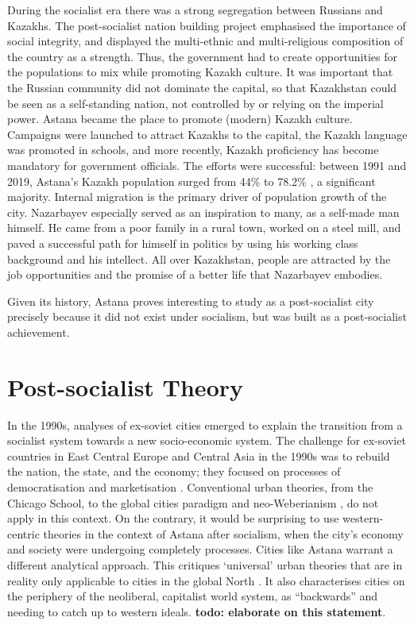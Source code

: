 \documentclass{article}
\begin{document}
During the socialist era there was a strong segregation between Russians and Kazakhs. The post-socialist nation building project emphasised the importance of social integrity, and displayed the multi-ethnic and multi-religious composition of the country as a strength. Thus, the government had to create opportunities for the populations to mix while promoting Kazakh culture. It was important that the Russian community did not dominate the capital, so that Kazakhstan could be seen as a self-standing nation, not controlled by or relying on the imperial power. 
Astana became the place to promote (modern) Kazakh culture. Campaigns were launched to attract Kazakhs to the capital, the Kazakh language was promoted in schools, and more recently, Kazakh proficiency has become mandatory for government officials. The efforts were successful: between 1991 and 2019, Astana's Kazakh population surged from 44\% to 78.2\% \parencite{unfpa2020wekazakhstan}, a significant majority. 
Internal migration is the primary driver of population growth of the city. Nazarbayev especially served as an inspiration to many, as a self-made man himself. He came from a poor family in a rural town, worked on a steel mill, and paved a successful path for himself in politics by using his working class background and his intellect. All over Kazakhstan, people are attracted by the job opportunities and the promise of a better life that Nazarbayev embodies.

Given its history, Astana proves interesting to study as a post-socialist city precisely because it did not exist under socialism, but was built as a post-socialist achievement.

\section{Post-socialist Theory}

In the 1990s, analyses of ex-soviet cities emerged to explain the transition from a socialist system towards a new socio-economic system. The challenge for ex-soviet countries in East Central Europe and Central Asia in the 1990s was to rebuild the nation, the state, and the economy; they focused on processes of democratisation and marketisation \parencite{ferenvcuhova2016introduction}. Conventional urban theories, from the Chicago School, to the global cities paradigm and neo-Weberianism \parencite{haussermann2005european}, do not apply in this context.
On the contrary, it would be surprising to use western-centric theories in the context of Astana after socialism, when the city's economy and society were undergoing completely processes. Cities like Astana warrant a different analytical approach. This critiques `universal' urban theories that are in reality only applicable to cities in the global North \parencite{ferenvcuhova2016accounts} \parencite{robinson2013ordinary}. It also characterises cities on the periphery of the neoliberal, capitalist world system, as ``backwards'' and needing to catch up to western ideals. \textbf{todo: elaborate on this statement}.
\end{document}

